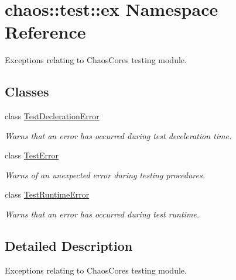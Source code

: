 \hypertarget{namespacechaos_1_1test_1_1ex}{}\section{chaos\+:\+:test\+:\+:ex Namespace Reference}
\label{namespacechaos_1_1test_1_1ex}


Exceptions relating to Chaos\+Core\textquotesingle{}s testing module.  


\subsection*{Classes}
\begin{DoxyCompactItemize}
\item 
class \hyperlink{classchaos_1_1test_1_1ex_1_1_test_decleration_error}{Test\+Decleration\+Error}
\begin{DoxyCompactList}\small\item\em Warns that an error has occurred during test deceleration time. \end{DoxyCompactList}\item 
class \hyperlink{classchaos_1_1test_1_1ex_1_1_test_error}{Test\+Error}
\begin{DoxyCompactList}\small\item\em Warns of an unexpected error during testing procedures. \end{DoxyCompactList}\item 
class \hyperlink{classchaos_1_1test_1_1ex_1_1_test_runtime_error}{Test\+Runtime\+Error}
\begin{DoxyCompactList}\small\item\em Warns that an error has occurred during test runtime. \end{DoxyCompactList}\end{DoxyCompactItemize}


\subsection{Detailed Description}
Exceptions relating to Chaos\+Core\textquotesingle{}s testing module. 